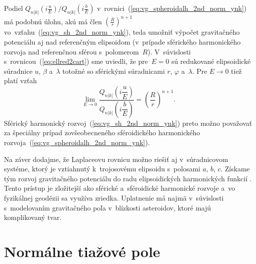 \documentclass[a4paper,12pt]{book}
\begin{document}
Podiel $Q_{n|k|}\left( i \frac{u}{E} \right) \slash Q_{n|k|}\left( 
i \frac{b}{E} \right)$ v~rovnici~(\ref{eq:vg_spheroidalh_2nd_norm_ynk}) má 
podobnú úlohu, akú má člen $\left( \frac{R}{r} \right)^{n + 1}$ 
vo~vzťahu~(\ref{eq:vg_sh_2nd_norm_ynk}), teda umožniť výpočet gravitačného 
potenciálu aj nad referenčným elipsoidom (v~prípade sférického harmonického 
rozvoja nad referenčnou sférou s~polomerom~$R$).  V~súvislosti 
s~rovnicou~(\ref{eq:ellred2cart}) sme uviedli, že pre~$E = 0$ sú redukované 
elipsoidické súradnice $u$, $\beta$ a~$\lambda$ totožné so sférickými 
súradnicami $r$, $\varphi$ a~$\lambda$.  Pre $E \rightarrow 0$ tiež platí vzťah 
\parencite{MoritzPhysicalGeodesy}
%
\begin{equation}
\lim_{E \rightarrow 0} \frac{Q_{n|k|}\left( i \dfrac{u}{E} 
\right)}{Q_{n|k|}\left( i \dfrac{b}{E} \right)} = \left( \frac{R}{r} \right)^{n 
+ 1}{.}
\end{equation}
%
Sférický harmonický rozvoj~(\ref{eq:vg_sh_2nd_norm_ynk}) preto možno považovať 
za špeciálny prípad zovšeobecneného sféroidického harmonického 
rozvoja~(\ref{eq:vg_spheroidalh_2nd_norm_ynk}).

Na záver dodajme, že Laplaceovu rovnicu možno riešiť aj v~súradnicovom systéme, 
ktorý je vztiahnutý k~trojosovému elipsoidu s~polosami $a$, $b$, $c$.  Získame 
tým rozvoj gravitačného potenciálu do radu elipsoidických harmonických funkcií 
\parencite[napríklad][]{Garmier2001,Hu2015,Reimond2016}.  Tento prístup je 
zložitejší ako sférické a~sféroidické harmonické rozvoje a~vo fyzikálnej 
geodézii sa využíva zriedka.  Uplatnenie má najmä v~súvislosti s~modelovaním 
gravitačného poľa v~blízkosti asteroidov, ktoré majú komplikovaný tvar.










\chapter{Normálne tiažové pole}
\label{sec:normal_gravity_field}
\end{document}
